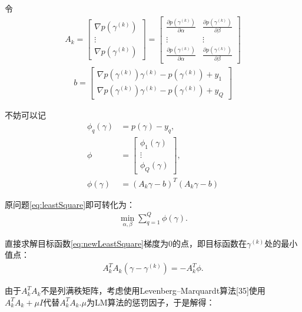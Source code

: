 \documentclass[UTF8]{csoarticle}
\begin{document}
令
\begin{align}\label{eq:leastSquareAK}
A_k=\begin{bmatrix}\nabla p(\gamma^{(k)})\\ \vdots \\ \nabla p(\gamma^{(k)})\end{bmatrix}=\begin{bmatrix}\frac{\partial p(\gamma^{(k)})}{\partial \alpha}&\frac{\partial p(\gamma^{(k)})}{\partial \beta}\\ \vdots& \vdots \\ \frac{\partial p(\gamma^{(k)})}{\partial \alpha}& \frac{\partial p(\gamma^{(k)})}{\partial \beta} \end{bmatrix}
\end{align}
\begin{align}\label{eq:leastSquareb}
b=\begin{bmatrix}\nabla p(\gamma^{(k)})\gamma^{(k)}-p(\gamma^{(k)}) + y_1 \\ \nabla p(\gamma^{(k)})\gamma^{(k)}-p(\gamma^{(k)}) + y_Q \end{bmatrix}
\end{align}

不妨可以记
\begin{align}\label{eq:leastSquareAlias}
\phi_q(\gamma)&=p(\gamma)-y_q,\\
\phi&=\begin{bmatrix}\phi_1(\gamma)\\ \vdots \\ \phi_Q(\gamma)\end{bmatrix},\\
\phi(\gamma)&=(A_k\gamma - b)^T(A_k\gamma - b)
\end{align}


原问题\eqref{eq:leastSquare}即可转化为：
\begin{align}\label{eq:newLeastSquare}
\mathop{min}\limits_{\alpha,\beta}\sum_{q=1}^Q{\phi(\gamma)}.
\end{align}

直接求解目标函数\eqref{eq:newLeastSquare}梯度为0的点，即目标函数在$\gamma^{(k)}$处的最小值点：
\begin{align}\label{eq:solveLeastSquare}
A_k^T A_k(\gamma - \gamma^{(k)})=-A_k^T\phi.
\end{align}

由于$A_k^T A_k$不是列满秩矩阵，考虑使用Levenberg–Marquardt算法[35]使用$A_k^T A_k+\mu I$代替$A_k^T A_k$.$\mu$为LM算法的惩罚因子，于是解得：
\end{document}
